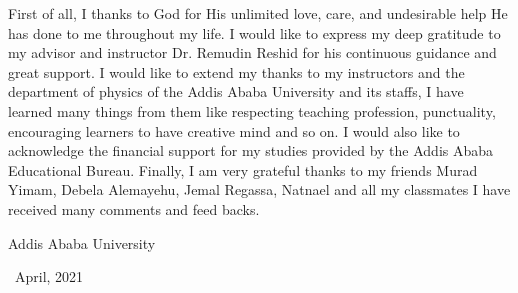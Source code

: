 \title{\thesistitle }
\author{\candidate}
\supervisor{\advisor} 
\firstexaminer{\firstreader} 
\secondexaminer{\secondreader} 



\setcounter{page}{1}



\beforepreface


First of all, I thanks to God for His unlimited love, care, and undesirable help He
has done to me throughout my life. I would like to express my deep gratitude
to my advisor and instructor Dr. Remudin Reshid for his continuous guidance and great support. I would like to extend my thanks to my instructors and the department of physics of the Addis Ababa University and its staffs, I have learned many things from them like respecting teaching profession, punctuality, encouraging learners to have creative mind and so on. I would also like to acknowledge the financial support for my studies provided by the Addis Ababa Educational
Bureau. Finally, I am very grateful thanks to my friends Murad Yimam, Debela Alemayehu, Jemal Regassa, Natnael and all my classmates I have received many comments and feed backs.

\parindent 0pt



\bigskip\medskip

\hfill Addis Ababa University \\
\medskip
\hfill \candidate \vspace{-0.2cm}

\ \hfill April, 2021

  
 
 
  
 
 
 
  
 
  
  
  
